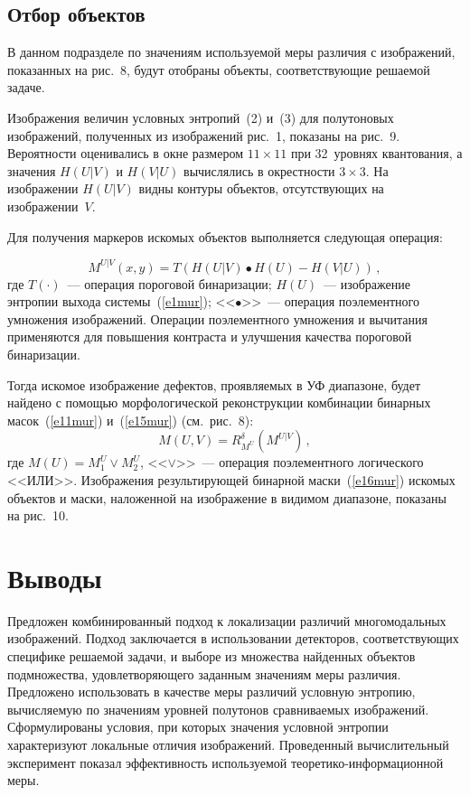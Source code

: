 \begin{multicols}{2}

\subsection{Отбор объектов} %
  
  В данном подразделе по значениям исполь\-зу\-емой меры различия с изображений, показанных 
на рис.~8, будут отобраны объекты, соответст\-ву\-ющие решаемой задаче.
  
  Изображения величин условных энтропий~(2) и~(3) для полутоновых изображений, 
полученных из изображений рис.~1, показаны на рис.~9. Вероятности оценивались в окне 
размером $11\times 11$ при 32~уровнях квантования, а значения $H(U\vert V)$ и $H(V\vert 
U)$ вычислялись в окрестности $3\times 3$. На изображении $H(U\vert V)$ видны контуры 
объектов, отсутствующих на изображении~$V$.

Для получения маркеров искомых объектов выполняется сле\-ду\-ющая операция:

  \pagebreak
  
  
\noindent
  $$
  M^{U\vert V}(x,y) =T\left( H\left( U\vert V\right)\bullet H(U)-H(V\vert U)\right)\,,
  $$
где $T(\cdot)$~--- операция пороговой бинаризации; $H(U)$~--- изображение энтропии 
выхода системы~(\ref{e1mur}); <<$\bullet$>>~--- операция поэлементного умножения 
изображений. Операции поэлементного умножения и вычитания применяются для 
повышения контраста и улучшения качества пороговой бинаризации.
  
  Тогда искомое изображение дефектов, проявляемых в УФ диапазоне, будет 
найдено с помощью морфологической реконструкции комбинации бинарных 
масок~(\ref{e11mur}) и~(\ref{e15mur}) (см.\ рис.~8):
  \begin{equation}
  M(U,V) =R^\delta_{M^U}\left(M^{U\vert V}\right)\,,
  \label{e16mur}
  \end{equation}
где $M(U)=M_1^U\vee M_2^U$, <<$\vee$>>~--- операция поэлементного логического 
<<ИЛИ>>. Изображения результирующей бинарной маски~(\ref{e16mur}) искомых объектов 
и маски, наложенной на изображение в видимом диапазоне, показаны на рис.~10.


\section{Выводы}

  Предложен комбинированный подход к локализации различий многомодальных 
изображений. Подход заключается в использовании детекторов, соответствующих 
специфике решаемой задачи, и выборе из множества найденных объектов подмножества, 
удовлетворяющего заданным значениям меры различия. Предложено использовать в 
качестве меры различий условную энтропию, вычисляемую по значениям уровней 
полутонов срав\-ни\-ва\-емых изображений. Сформулированы условия, при которых значения 
условной энтропии характеризуют локальные отличия изображений. Проведенный 
вычислительный эксперимент показал эффективность используемой теоретико-информационной меры. 


\end{multicols}
